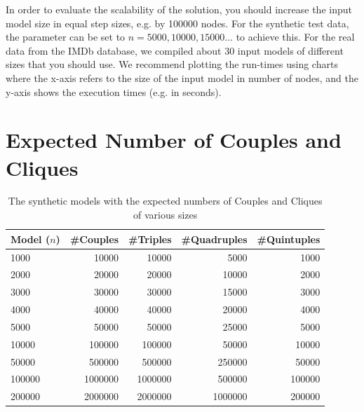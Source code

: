 \documentclass[a4paper,11pt]{article}
\begin{document}

In order to evaluate the scalability of the solution, you should
increase the input model size in equal step sizes, e.g. by 
100000 nodes. For the synthetic test data, the parameter can be
set to $n=5000, 10000, 15000\ldots$ to achieve this. For the
real data from the IMDb database, we compiled about 30 input 
models of different sizes that you should use.
We recommend plotting the run-times using charts where
the x-axis refers to the size of the input model in number of nodes,
and the y-axis shows the execution times (e.g. in seconds).





\appendix



\section{Expected Number of Couples and Cliques}
\label{sec:expected-numbers}

\begin{table}[h!]
  \centering
  \begin{tabular}{| l | r | r | r | r |}
    \hline
    \textbf{Model (\(n\))} & \textbf{\#Couples} & \textbf{\#Triples} & \textbf{\#Quadruples} & \textbf{\#Quintuples}\\
    \hline
    1000   & 10000   & 10000   & 5000    & 1000\\
    2000   & 20000   & 20000   & 10000   & 2000\\
    3000   & 30000   & 30000   & 15000   & 3000\\
    4000   & 40000   & 40000   & 20000   & 4000\\
    5000   & 50000   & 50000   & 25000   & 5000\\
    10000  & 100000  & 100000  & 50000   & 10000\\
    50000  & 500000  & 500000  & 250000  & 50000\\
    100000 & 1000000 & 1000000 & 500000  & 100000\\
    200000 & 2000000 & 2000000 & 1000000 & 200000\\
    \hline
\end{tabular}
\caption{The synthetic models with the expected numbers of Couples and Cliques of various sizes}
\label{tab:synthetic-numbers}
\end{table}
\end{document}
